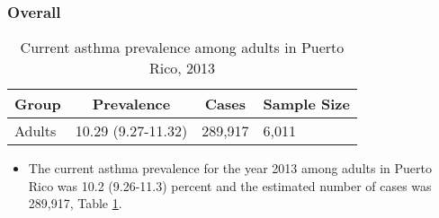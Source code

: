 






\subsubsection{Overall}




\begin{table}[H]
\caption{Current asthma prevalence among adults in Puerto Rico, 2013\label{tab:Overall.tabl.Asthma.2013}} 
\begin{center}
\begin{tabular}{llll}
\hline\hline
\multicolumn{1}{l}{Group}&\multicolumn{1}{c}{Prevalence}&\multicolumn{1}{c}{Cases}&\multicolumn{1}{c}{Sample Size}\tabularnewline
\hline
Adults&10.29 (9.27-11.32)&289,917&6,011\tabularnewline
\hline
\end{tabular}\end{center}

\end{table}




\begin{itemize}


\item The current asthma prevalence for the year 2013 among adults in Puerto Rico was 10.2 (9.26-11.3) percent and the estimated number of cases was 289,917, Table \ref{tab:Overall.tabl.Asthma.2013}.

\end{itemize}


